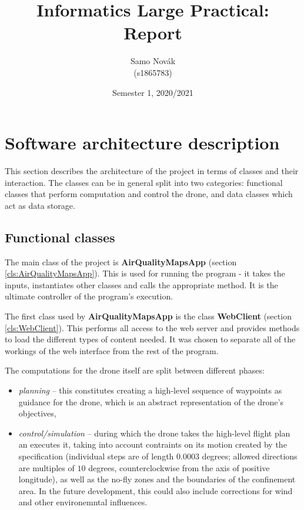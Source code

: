 \documentclass{article}
\title{Informatics Large Practical: Report}%
\author{Samo Nov\'ak\\(s1865783)}
\date{Semester 1, 2020/2021}
\newcommand{\sref}[1]{(section \ref{#1})}
\begin{document}
\maketitle

\tableofcontents

\pagebreak



\section{Software architecture description}

This section describes the architecture of the project in terms of classes and their interaction. The classes can be in general split into two categories: functional classes that perform computation and control the drone, and data classes which act as data storage.

\subsection{Functional classes}

The main class of the project is \textbf{AirQualityMapsApp} \sref{cls:AirQualityMapsApp}. This is used for running the program - it takes the inputs, instantiates other classes and calls the appropriate method. It is the ultimate controller of the program's execution.

The first class used by \textbf{AirQualityMapsApp} is the class \textbf{WebClient} \sref{cls:WebClient}. This performs all access to the web server and provides methods to load the different types of content needed. It was chosen to separate all of the workings of the web interface from the rest of the program.

The computations for the drone itself are split between different phases:
\begin{itemize}
\item \textit{planning} -- this constitutes creating a high-level sequence of waypoints as guidance for the drone, which is an abstract representation of the drone's objectives,
\item \textit{control/simulation} -- during which the drone takes the high-level flight plan an executes it, taking into account contraints on its motion created by the specification (individual steps are of length $0.0003$ degrees; allowed directions are multiples of $10$ degrees, counterclockwise from the axis of positive longitude), as well as the no-fly zones and the boundaries of the confinement area. In the future development, this could also include corrections for wind and other environemntal influences.
\end{itemize}
\end{document}
